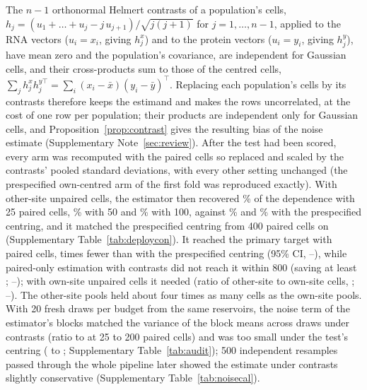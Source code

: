 The $n-1$ orthonormal Helmert contrasts of a population's cells, $h_j=(u_1+\dots+u_j-j\,u_{j+1})/\sqrt{j(j+1)}$ for $j=1,\dots,n-1$, applied to the RNA vectors ($u_i=x_i$, giving $h^x_j$) and to the protein vectors ($u_i=y_i$, giving $h^y_j$), have mean zero and the population's covariance, are independent for Gaussian cells, and their cross-products sum to those of the centred cells, $\sum_jh^x_jh^{y\top}_j=\sum_i(x_i-\bar x)(y_i-\bar y)^\top$. Replacing each population's cells by its contrasts therefore keeps the estimand and makes the rows uncorrelated, at the cost of one row per population; their products are independent only for Gaussian cells, and Proposition~\ref{prop:contrast} gives the resulting bias of the noise estimate (Supplementary Note~\ref{sec:review}). After the test had been scored, every arm was recomputed with the paired cells so replaced and scaled by the contrasts' pooled standard deviations, with every other setting unchanged (the prespecified own-centred arm of the first fold was reproduced exactly). With other-site unpaired cells, the estimator then recovered \CtOtherFirst\% of the dependence with 25 paired cells, \CtOtherFifty\% with 50 and \CtOtherHundred\% with 100, against \CtFrozenOtherFirst\% and \CtFrozenOtherHundred\% with the prespecified centring, and it matched the prespecified centring from 400 paired cells on (Supplementary Table~\ref{tab:deploycon}). It reached the primary target with \CtCellsOther{} paired cells, \CtVsFrozen{} times fewer than with the prespecified centring (95\% CI, \CtVsFrozenLo--\CtVsFrozenHi), while paired-only estimation with contrasts did not reach it within 800 (saving at least \CtSaveOther; \CtSaveOtherLo--\CtSaveOtherHi); with own-site unpaired cells it needed \CtCellsSame{} (ratio of other-site to own-site cells, \CtOverSame; \CtOverSameLo--\CtOverSameHi). The other-site pools held about four times as many cells as the own-site pools. With 20 fresh draws per budget from the same reservoirs, the noise term of the estimator's blocks matched the variance of the block means across draws under contrasts (ratio \DpCalConMin{} to \DpCalConMax{} at 25 to 200 paired cells) and was too small under the test's centring (\DpCalDfMin{} to \DpCalDfMax; Supplementary Table~\ref{tab:audit}); 500 independent resamples passed through the whole pipeline later showed the estimate under contrasts slightly conservative (Supplementary Table~\ref{tab:noisecal}).

\begin{table}[h]
\caption{\textbf{Bone-marrow test with paired cells centred by contrasts (after scoring).} As Supplementary Table~\ref{tab:deploy}, with every population's drawn paired cells replaced by their Helmert contrasts and scaled by the contrasts' pooled standard deviations; target as there.}
\label{tab:deploycon}
\centering\footnotesize

\end{table}

